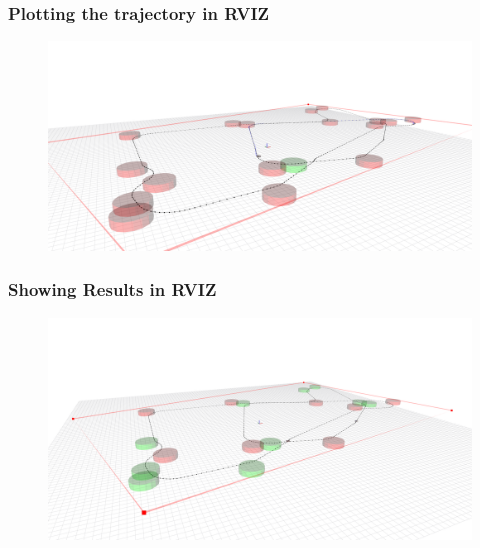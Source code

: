 \documentclass[aspectratio=1610]{beamer}
\begin{document}
\begin{frame}
\frametitle{Plotting the trajectory in RVIZ}

  \begin{figure}
    \includegraphics[width=1.0\textwidth]{./fig/rviz_1.png}
  \end{figure}

\end{frame}

\begin{frame}
\frametitle{Showing Results in RVIZ}

  \begin{figure}
    \includegraphics[width=1.0\textwidth]{./fig/rviz_2.png}
  \end{figure}

\end{frame}

\end{document}
